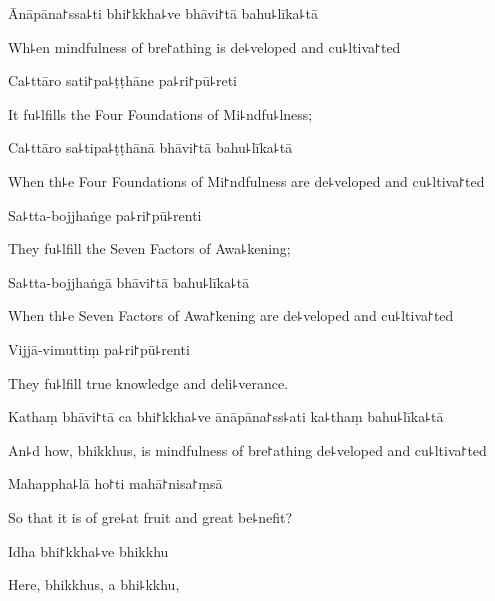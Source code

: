Ānāpāna꜓ssa꜕ti bhi꜓kkha꜕ve bhāvi꜓tā bahu꜕līka꜕tā

\begin{english}
  Wh꜕en mindfulness of bre꜓athing is de꜕veloped and cu꜕ltiva꜓ted
\end{english}

Ca꜕ttāro sati꜓pa꜕ṭṭhāne pa꜕ri꜓pū꜕reti

\begin{english}
  It fu꜕lfills the Four Foundations of Mi꜕ndfu꜕lness;
\end{english}

Ca꜕ttāro sa꜕tipa꜕ṭṭhānā bhāvi꜓tā bahu꜕līka꜕tā

\begin{english}
  When th꜕e Four Foundations of Mi꜓ndfulness are de꜕veloped and cu꜕ltiva꜓ted
\end{english}

Sa꜕tta-bojjhaṅge pa꜕ri꜓pū꜕renti

\begin{english}
  They fu꜕lfill the Seven Factors of Awa꜕kening;
\end{english}

Sa꜕tta-bojjhaṅgā bhāvi꜓tā bahu꜕līka꜕tā

\begin{english}
  When th꜕e Seven Factors of Awa꜓kening are de꜕veloped and cu꜕ltiva꜓ted
\end{english}

Vijjā-vimuttiṃ pa꜕ri꜓pū꜕renti

\begin{english}
  They fu꜕lfill true knowledge and deli꜕verance.
\end{english}

Kathaṃ bhāvi꜓tā ca bhi꜓kkha꜕ve ānāpāna꜓ss꜕ati ka꜕thaṃ bahu꜕līka꜕tā

\begin{english}
  An꜕d how, bhikkhus, is mindfulness of bre꜓athing de꜕veloped and cu꜕ltiva꜓ted
\end{english}

Mahappha꜕lā ho꜓ti mahā꜓nisa꜓ṃsā

\begin{english}
  So that it is of gre꜕at fruit and great be꜕nefit?
\end{english}

Idha bhi꜓kkha꜕ve bhikkhu

\begin{english}
  Here, bhikkhus, a bhi꜕kkhu,
\end{english}


